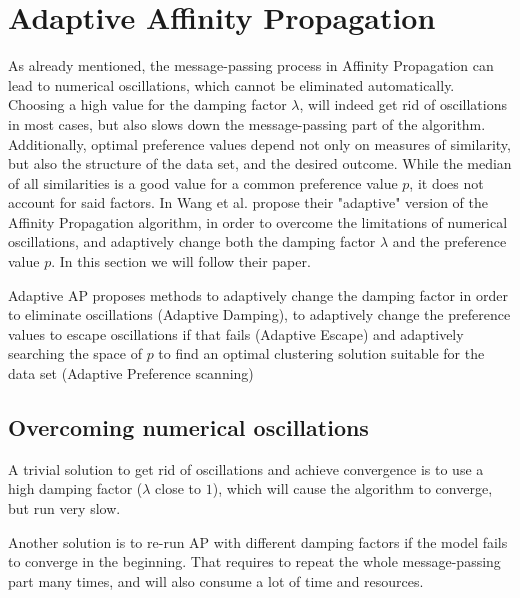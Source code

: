\documentclass[11pt,a4paper]{article}
\begin{document}
\section{Adaptive Affinity Propagation}
As already mentioned, the message-passing process in Affinity Propagation can lead to numerical oscillations, which cannot be eliminated automatically. Choosing a high value for the damping factor $\lambda$, will indeed get rid of oscillations in most cases, but also slows down the message-passing part of the algorithm. Additionally, optimal preference values depend not only on measures of similarity, but also the structure of the data set, and the desired outcome. While the median of all similarities is a good value for a common preference value $p$, it does not account for said factors. In \cite{wang2008adaptive} Wang et al. propose their "adaptive" version of the Affinity Propagation algorithm, in order to overcome the limitations of numerical oscillations, and adaptively change both the damping factor $\lambda$ and the preference value $p$. In this section we will follow their paper.

Adaptive AP proposes methods to adaptively change the damping factor in order to eliminate oscillations (Adaptive Damping), to adaptively change the preference values to escape oscillations if that fails (Adaptive Escape) and adaptively searching the space of $p$ to find an optimal clustering solution suitable for the data set (Adaptive Preference scanning)
\subsection{Overcoming numerical oscillations}
A trivial solution to get rid of oscillations and achieve convergence is to use a high damping factor ($\lambda$ close to $1$), which will cause the algorithm to converge, but run very slow.

Another solution is to re-run AP with different damping factors if the model fails to converge in the beginning. That requires to repeat the whole message-passing part many times, and will also consume a lot of time and resources.
\end{document}
